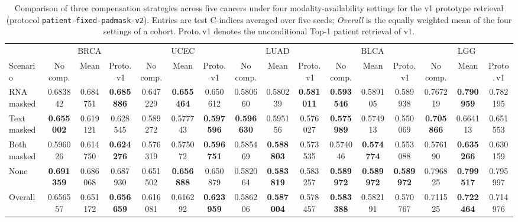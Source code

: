 \documentclass[11pt,a4paper]{article}
\begin{document}
\begin{table}[htbp]
\centering
\caption{Comparison of three compensation strategies across five cancers
under four modality-availability settings for the v1 prototype retrieval
(protocol \texttt{patient-fixed-padmask-v2}). Entries are test C-indices
averaged over five seeds; \emph{Overall} is the equally weighted mean of the
four settings of a cohort. Proto.\,v1 denotes the unconditional Top-1 patient
retrieval of v1.}
\label{tab:prototype-compensation-v1}
\scriptsize
\setlength{\tabcolsep}{2pt}
\renewcommand{\arraystretch}{1.35}
\begin{tabular*}{\linewidth}{@{\extracolsep{\fill}}l*{15}{c}@{}}
\toprule
 & \multicolumn{3}{c}{BRCA} & \multicolumn{3}{c}{UCEC}
 & \multicolumn{3}{c}{LUAD} & \multicolumn{3}{c}{BLCA}
 & \multicolumn{3}{c}{LGG} \\
\cmidrule(lr){2-4}\cmidrule(lr){5-7}\cmidrule(lr){8-10}
\cmidrule(lr){11-13}\cmidrule(lr){14-16}
Scenario
 & No comp. & Mean & Proto.\,v1
 & No comp. & Mean & Proto.\,v1
 & No comp. & Mean & Proto.\,v1
 & No comp. & Mean & Proto.\,v1
 & No comp. & Mean & Proto.\,v1 \\
\midrule
RNA masked & 0.683842 & 0.684751 & \textbf{0.685886} & 0.647229 & \textbf{0.655464} & 0.650612 & 0.580660 & 0.580239 & \textbf{0.581011} & \textbf{0.593546} & 0.589105 & 0.589938 & 0.767219 & \textbf{0.790959} & 0.782195 \\
Text masked & \textbf{0.655002} & 0.619121 & 0.628545 & 0.589272 & 0.577743 & \textbf{0.597596} & \textbf{0.596630} & 0.595156 & 0.576027 & \textbf{0.575989} & 0.574913 & 0.550069 & \textbf{0.705866} & 0.664113 & 0.651553 \\
Both masked & 0.596026 & 0.614750 & \textbf{0.624276} & 0.576319 & 0.575072 & \textbf{0.596751} & 0.585469 & \textbf{0.588803} & 0.573535 & 0.574046 & \textbf{0.574774} & 0.553088 & 0.576190 & \textbf{0.635266} & 0.630159 \\
None & \textbf{0.691359} & 0.686068 & 0.687930 & 0.651502 & \textbf{0.656888} & 0.650879 & 0.582064 & \textbf{0.583819} & 0.583257 & \textbf{0.589972} & \textbf{0.589972} & \textbf{0.589972} & 0.796825 & \textbf{0.799517} & 0.795997 \\
\midrule
Overall & 0.656557 & 0.651172 & \textbf{0.656659} & 0.616081 & 0.616292 & \textbf{0.623959} & 0.586206 & \textbf{0.587004} & 0.578457 & \textbf{0.583388} & 0.582191 & 0.570767 & 0.711525 & \textbf{0.722464} & 0.714976 \\

\end{tabular*}
\end{table}
\end{document}
